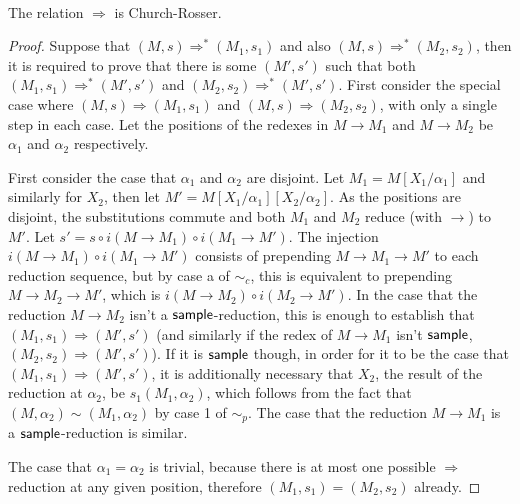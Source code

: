 \paragraph{}
\begin{lemma} \label{churchRosser}
The relation $\Rightarrow$ is Church-Rosser.
\end{lemma}
\begin{proof}
Suppose that $(M,s) \Rightarrow^* (M_1,s_1)$ and also $(M,s) \Rightarrow^* (M_2,s_2)$, then it is required to prove that there is some $(M',s')$ such that both $(M_1,s_1) \Rightarrow^* (M',s')$ and $(M_2,s_2) \Rightarrow^* (M',s')$. First consider the special case where $(M,s) \Rightarrow (M_1,s_1)$ and $(M,s) \Rightarrow (M_2,s_2)$, with only a single step in each case. Let the positions of the redexes in $M \to M_1$ and $M \to M_2$ be $\alpha_1$ and $\alpha_2$ respectively.

First consider the case that $\alpha_1$ and $\alpha_2$ are disjoint. Let $M_1 = M[X_1/\alpha_1]$ and similarly for $X_2$, then let $M' = M[X_1/\alpha_1][X_2/\alpha_2]$. As the positions are disjoint, the substitutions commute and both $M_1$ and $M_2$ reduce (with $\to$) to $M'$. 
Let $s' = s \circ i(M \to M_1) \circ i(M_1 \to M')$. 
The injection $i(M \to M_1) \circ i(M_1 \to M')$ consists of prepending $M \to M_1 \to M'$ to each reduction sequence, but by case a of $\sim_c$, this is equivalent to prepending $M \to M_2 \to M'$, which is $i(M \to M_2) \circ i(M_2 \to M')$. 
In the case that the reduction $M \to M_2$ isn't a $\mathsf{sample}$-reduction, this is enough to establish that $(M_1, s_1) \Rightarrow (M', s')$ (and similarly if the redex of $M \to M_1$ isn't $\mathsf{sample}$, $(M_2,s_2) \Rightarrow (M',s')$).
If it is $\mathsf{sample}$ though, in order for it to be the case that $(M_1, s_1) \Rightarrow (M', s')$, it is additionally necessary that $X_2$, the result of the reduction at $\alpha_2$, be $s_1(M_1, \alpha_2)$, which follows from the fact that $(M, \alpha_2) \sim (M_1, \alpha_2)$ by case 1 of $\sim_p$. 
The case that the reduction $M \to M_1$ is a $\mathsf{sample}$-reduction is similar.

The case that $\alpha_1 = \alpha_2$ is trivial, because there is at most one possible $\Rightarrow$ reduction at any given position, therefore $(M_1, s_1) = (M_2, s_2)$ already.


\end{proof}
